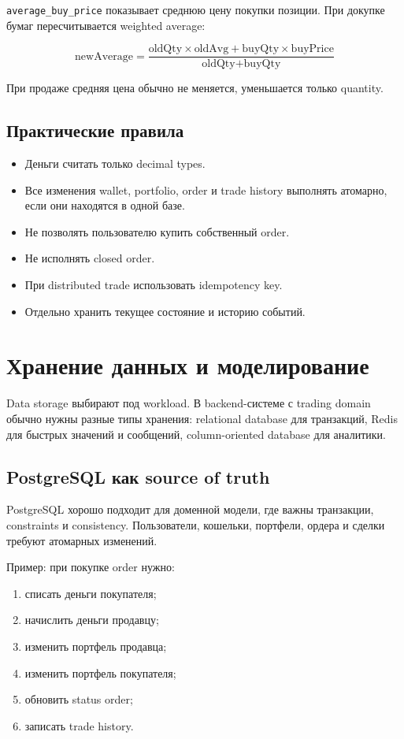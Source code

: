 \documentclass[12pt,a4paper]{article}
\begin{document}
\texttt{average\_buy\_price} показывает среднюю цену покупки позиции. При докупке
бумаг пересчитывается weighted average:

\[
\text{newAverage} = \frac{\text{oldQty} \times \text{oldAvg} + \text{buyQty} \times \text{buyPrice}}{\text{oldQty} + \text{buyQty}}
\]

При продаже средняя цена обычно не меняется, уменьшается только quantity.

\subsection{Практические правила}

\begin{itemize}
    \item Деньги считать только decimal types.
    \item Все изменения wallet, portfolio, order и trade history выполнять
          атомарно, если они находятся в одной базе.
    \item Не позволять пользователю купить собственный order.
    \item Не исполнять closed order.
    \item При distributed trade использовать idempotency key.
    \item Отдельно хранить текущее состояние и историю событий.
\end{itemize}

\newpage
\section{Хранение данных и моделирование}

Data storage выбирают под workload. В backend-системе с trading domain обычно
нужны разные типы хранения: relational database для транзакций, Redis для быстрых
значений и сообщений, column-oriented database для аналитики.

\subsection{PostgreSQL как source of truth}

PostgreSQL хорошо подходит для доменной модели, где важны транзакции, constraints
и consistency. Пользователи, кошельки, портфели, ордера и сделки требуют
атомарных изменений.

Пример: при покупке order нужно:
\begin{enumerate}
    \item списать деньги покупателя;
    \item начислить деньги продавцу;
    \item изменить портфель продавца;
    \item изменить портфель покупателя;
    \item обновить status order;
    \item записать trade history.
\end{enumerate}
\end{document}
